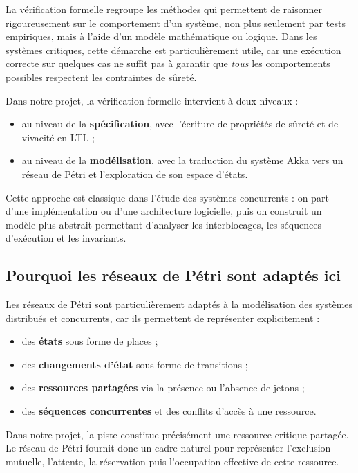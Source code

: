 \documentclass[11pt,a4paper]{article}
\begin{document}
La vérification formelle regroupe les méthodes qui permettent de raisonner rigoureusement sur le comportement d'un système, non plus seulement par tests empiriques, mais à l'aide d'un modèle mathématique ou logique. Dans les systèmes critiques, cette démarche est particulièrement utile, car une exécution correcte sur quelques cas ne suffit pas à garantir que \emph{tous} les comportements possibles respectent les contraintes de sûreté.

Dans notre projet, la vérification formelle intervient à deux niveaux :
\begin{itemize}
    \item au niveau de la \textbf{spécification}, avec l'écriture de propriétés de sûreté et de vivacité en LTL ;
    \item au niveau de la \textbf{modélisation}, avec la traduction du système Akka vers un réseau de Pétri et l'exploration de son espace d'états.
\end{itemize}

Cette approche est classique dans l'étude des systèmes concurrents : on part d'une implémentation ou d'une architecture logicielle, puis on construit un modèle plus abstrait permettant d'analyser les interblocages, les séquences d'exécution et les invariants.

\subsection{Pourquoi les réseaux de Pétri sont adaptés ici}

Les réseaux de Pétri sont particulièrement adaptés à la modélisation des systèmes distribués et concurrents, car ils permettent de représenter explicitement :
\begin{itemize}
    \item des \textbf{états} sous forme de places ;
    \item des \textbf{changements d'état} sous forme de transitions ;
    \item des \textbf{ressources partagées} via la présence ou l'absence de jetons ;
    \item des \textbf{séquences concurrentes} et des conflits d'accès à une ressource.
\end{itemize}

Dans notre projet, la piste constitue précisément une ressource critique partagée. Le réseau de Pétri fournit donc un cadre naturel pour représenter l'exclusion mutuelle, l'attente, la réservation puis l'occupation effective de cette ressource.
\end{document}
